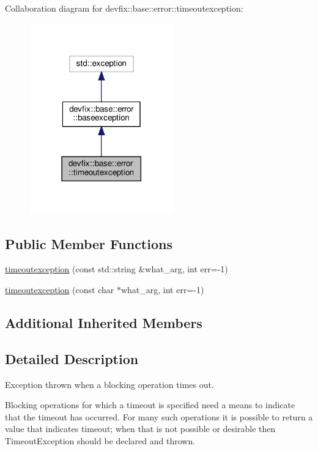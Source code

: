 Collaboration diagram for devfix\+:\+:base\+:\+:error\+:\+:timeoutexception\+:
\nopagebreak
\begin{figure}[H]
\begin{center}
\leavevmode
\includegraphics[width=177pt]{structdevfix_1_1base_1_1error_1_1timeoutexception__coll__graph}
\end{center}
\end{figure}
\subsection*{Public Member Functions}
\begin{DoxyCompactItemize}
\item 
\hyperlink{structdevfix_1_1base_1_1error_1_1timeoutexception_abb684b432a5367385d8f975898226c8d}{timeoutexception} (const std\+::string \&what\+\_\+arg, int err=-\/1)
\item 
\hyperlink{structdevfix_1_1base_1_1error_1_1timeoutexception_a7096cca05d73ac6da75746d1737e1ec1}{timeoutexception} (const char $\ast$what\+\_\+arg, int err=-\/1)
\end{DoxyCompactItemize}
\subsection*{Additional Inherited Members}


\subsection{Detailed Description}
Exception thrown when a blocking operation times out. 

Blocking operations for which a timeout is specified need a means to indicate that the timeout has occurred. For many such operations it is possible to return a value that indicates timeout; when that is not possible or desirable then Timeout\+Exception should be declared and thrown. 

